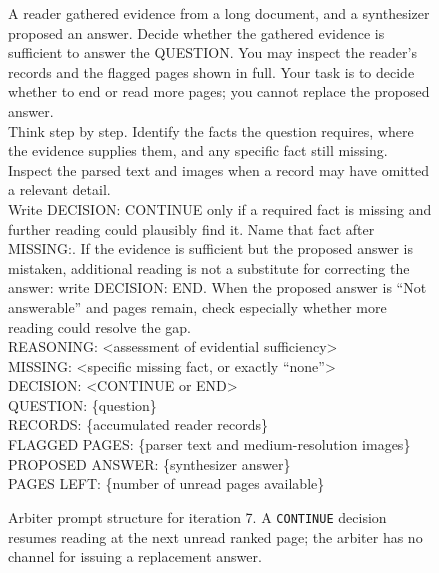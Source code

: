 \begin{figure}[t]
\centering
\begin{tcolorbox}[
  colback=gray!5,colframe=gray!50,boxrule=0.4pt,
  fontupper=\small\ttfamily,left=6pt,right=6pt
]
A reader gathered evidence from a long document, and a synthesizer
proposed an answer. Decide whether the gathered evidence is sufficient
to answer the QUESTION. You may inspect the reader's records and the
flagged pages shown in full. Your task is to decide whether to end or
read more pages; you cannot replace the proposed answer.\\[0.5em]

Think step by step. Identify the facts the question requires, where
the evidence supplies them, and any specific fact still missing.
Inspect the parsed text and images when a record may have omitted a
relevant detail.\\[0.5em]

Write DECISION: CONTINUE only if a required fact is missing and further
reading could plausibly find it. Name that fact after MISSING:. If the
evidence is sufficient but the proposed answer is mistaken, additional
reading is not a substitute for correcting the answer: write
DECISION: END. When the proposed answer is ``Not answerable'' and pages
remain, check especially whether more reading could resolve the gap.\\[0.5em]

REASONING: <assessment of evidential sufficiency>\\
MISSING: <specific missing fact, or exactly ``none''>\\
DECISION: <CONTINUE or END>\\[0.5em]

QUESTION: \{question\}\\
RECORDS: \{accumulated reader records\}\\
FLAGGED PAGES: \{parser text and medium-resolution images\}\\
PROPOSED ANSWER: \{synthesizer answer\}\\
PAGES LEFT: \{number of unread pages available\}
\end{tcolorbox}
\caption{Arbiter prompt structure for iteration 7. A \texttt{CONTINUE} decision resumes reading at the next unread ranked page; the arbiter has no channel for issuing a replacement answer.}
\label{fig:app_arbiter_prompt}
\end{figure}